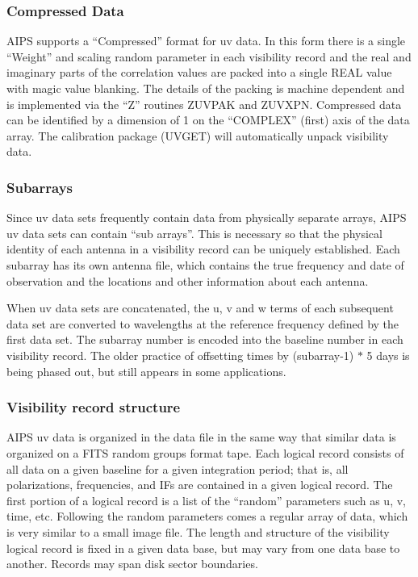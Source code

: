 \subsubsection{Compressed Data}

AIPS supports a ``Compressed'' format for uv data.  In this form there
is a single ``Weight'' and scaling random parameter in each visibility
record and the real and imaginary parts of the correlation values are
packed into a single REAL value with magic value blanking.  The
details of the packing is machine dependent and is implemented via the
``Z'' routines ZUVPAK and ZUVXPN.  Compressed data can be identified
by a dimension of 1 on the ``COMPLEX'' (first) axis of the data array.
The calibration package (UVGET) will automatically unpack visibility
data.

\subsubsection{Subarrays}
Since uv data sets frequently contain data from physically separate
arrays, AIPS uv data sets can contain ``sub arrays''.  This is necessary
so that the physical identity of each antenna in a visibility record
can be uniquely established.  Each subarray has its own antenna file,
which contains the true frequency and date of observation and the
locations and other information about each antenna.

When uv data sets are concatenated, the u, v and w terms of each
subsequent data set are converted to wavelengths at the reference
frequency defined by the first data set.  The subarray number is
encoded into the baseline number in each visibility record. The older
practice of offsetting times by (subarray-1) $\ast$ 5 days is being phased
out, but still appears in some applications.

\subsubsection{Visibility record structure}
AIPS uv data is organized in the data file in the same way that
similar data is organized on a FITS random groups format tape.  Each
logical record consists of all data on a given baseline for a given
integration period; that is, all polarizations, frequencies, and IFs
are contained in a given logical record. The first portion of a
logical record is a list of the ``random'' parameters such as u, v,
time, etc.  Following the random parameters comes a regular array of
data, which is very similar to a small image file.  The length and
structure of the visibility logical record is fixed in a given data
base, but may vary from one data base to another.  Records may span
disk sector boundaries.

